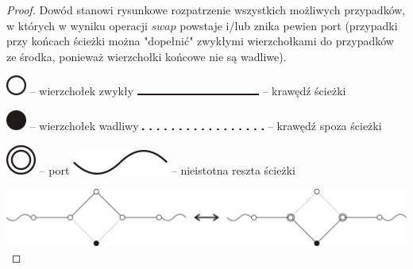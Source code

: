 \documentclass{pracamgr}
\begin{document}
    \begin{proof}
     Dowód stanowi rysunkowe rozpatrzenie wszystkich możliwych przypadków, w których w wyniku operacji $swap$ powstaje i/lub znika pewien port
     (przypadki przy końcach ścieżki można "dopełnić" zwykłymi wierzchołkami do przypadków ze środka, ponieważ wierzchołki końcowe nie są wadliwe).
     \begin{multicols}{3}
      \begin{center}
       \includegraphics[scale=0.75]{img/Q_swap_l1.jpg}
       -- wierzchołek zwykły\newline
       \includegraphics[scale=0.75]{img/Q_swap_l4.jpg}
       -- krawędź ścieżki\newline
      \end{center}
      \begin{center}
       \includegraphics[scale=0.75]{img/Q_swap_l2.jpg}
       -- wierzchołek wadliwy\newline
       \includegraphics[scale=0.75]{img/Q_swap_l5.jpg}
       -- krawędź spoza ścieżki\newline
      \end{center}
      \begin{center}
       \includegraphics[scale=0.75]{img/Q_swap_l3.jpg}
       -- port\newline
       \includegraphics[scale=0.75]{img/Q_swap_l6.jpg}
       -- nieistotna reszta ścieżki\newline
      \end{center}
     \end{multicols}
     \noindent
     \hspace*{30pt}\includegraphics[scale=0.75]{img/Q_swap_1.jpg}\newline\newline

\end{proof}
\end{document}
